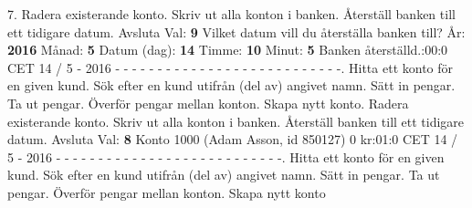 \begin{multicols}{2}
7.   Radera existerande konto.   Skriv ut alla konton i banken.   Återställ banken till ett tidigare datum. Avsluta\newline
Val: \textbf{9}\newline
Vilket datum vill du återställa banken till?\newline
År: \textbf{2016}\newline
Månad: \textbf{5}\newline
Datum (dag): \textbf{14}\newline
Timme: \textbf{10}\newline
Minut: \textbf{5}\newline
Banken återställd.:00:0 CET 14 / 5 - 2016\newline
- - - - - - - - - - - - - - - - - - - - - - - - - - -.   Hitta ett konto för en given kund.   Sök efter en kund utifrån (del av) angivet namn.   Sätt in pengar.   Ta ut pengar.   Överför pengar mellan konton.   Skapa nytt konto.   Radera existerande konto.   Skriv ut alla konton i banken.   Återställ banken till ett tidigare datum. Avsluta\newline
Val: \textbf{8}\newline
Konto 1000 (Adam Asson, id 850127) 0 kr:01:0 CET 14 / 5 - 2016\newline
- - - - - - - - - - - - - - - - - - - - - - - - - - -.   Hitta ett konto för en given kund.   Sök efter en kund utifrån (del av) angivet namn.   Sätt in pengar.   Ta ut pengar.   Överför pengar mellan konton.   Skapa nytt konto\newline

\end{multicols}
